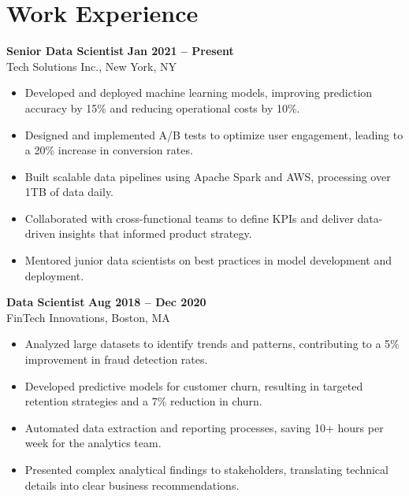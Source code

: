 \documentclass[10pt]{article}
\begin{document}
\section*{Work Experience}
\vspace{-4pt}

\textbf{Senior Data Scientist} \hfill \textbf{Jan 2021 – Present} \\
Tech Solutions Inc., New York, NY
\begin{itemize}
    \item Developed and deployed machine learning models, improving prediction accuracy by 15\% and reducing operational costs by 10\%.
    \item Designed and implemented A/B tests to optimize user engagement, leading to a 20\% increase in conversion rates.
    \item Built scalable data pipelines using Apache Spark and AWS, processing over 1TB of data daily.
    \item Collaborated with cross-functional teams to define KPIs and deliver data-driven insights that informed product strategy.
    \item Mentored junior data scientists on best practices in model development and deployment.
\end{itemize}

\vspace{6pt}

\textbf{Data Scientist} \hfill \textbf{Aug 2018 – Dec 2020} \\
FinTech Innovations, Boston, MA
\begin{itemize}
    \item Analyzed large datasets to identify trends and patterns, contributing to a 5\% improvement in fraud detection rates.
    \item Developed predictive models for customer churn, resulting in targeted retention strategies and a 7\% reduction in churn.
    \item Automated data extraction and reporting processes, saving 10+ hours per week for the analytics team.
    \item Presented complex analytical findings to stakeholders, translating technical details into clear business recommendations.
\end{itemize}

\end{document}
